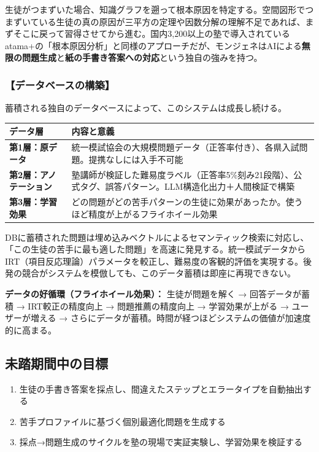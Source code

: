 \documentclass[paper=a4,fontsize=10.5bp,jafontsize=10.5bp,twocolumn]{jlreq}
\begin{document}
生徒がつまずいた場合、知識グラフを遡って根本原因を特定する。空間図形でつまずいている生徒の真の原因が三平方の定理や因数分解の理解不足であれば、まずそこに戻って習得させてから進む。国内3,200以上の塾で導入されているatama+の「根本原因分析」と同様のアプローチだが、モンジェネはAIによる\textbf{無限の問題生成}と\textbf{紙の手書き答案への対応}という独自の強みを持つ。

\subsubsection{【データベースの構築】}

蓄積される独自のデータベースによって、このシステムは成長し続ける。

\begin{scriptsize}\noindent
\begin{tabularx}{\linewidth}{>{\bfseries}l X}
\toprule
データ層 & 内容と意義 \\
\midrule
第1層：原データ & 統一模試協会の大規模問題データ（正答率付き）、各県入試問題。提携なしには入手不可能 \\
第2層：アノテーション & 塾講師が検証した難易度ラベル（正答率5\%刻み21段階）、公式タグ、誤答パターン。LLM構造化出力＋人間検証で構築 \\
第3層：学習効果 & どの問題がどの苦手パターンの生徒に効果があったか。使うほど精度が上がるフライホイール効果 \\
\bottomrule
\end{tabularx}
\end{scriptsize}

DBに蓄積された問題は埋め込みベクトルによるセマンティック検索に対応し、「この生徒の苦手に最も適した問題」を高速に発見する。統一模試データからIRT（項目反応理論）パラメータを較正し、難易度の客観的評価を実現する。後発の競合がシステムを模倣しても、このデータ蓄積は即座に再現できない。

\begin{graybox}
\textbf{データの好循環（フライホイール効果）：}
生徒が問題を解く → 回答データが蓄積 → IRT較正の精度向上 → 問題推薦の精度向上 → 学習効果が上がる → ユーザーが増える → さらにデータが蓄積。時間が経つほどシステムの価値が加速度的に高まる。
\end{graybox}

\subsection{未踏期間中の目標}

\begin{enumerate}[leftmargin=2em]
  \item 生徒の手書き答案を採点し、間違えたステップとエラータイプを自動抽出する
  \item 苦手プロファイルに基づく個別最適化問題を生成する
  \item 採点→問題生成のサイクルを塾の現場で実証実験し、学習効果を検証する
\end{enumerate}
\end{document}
